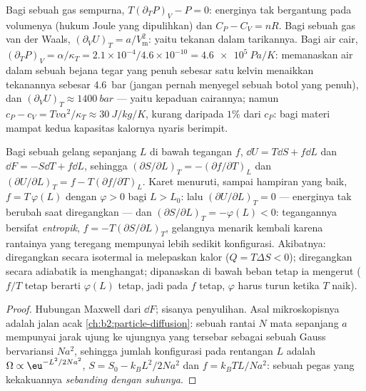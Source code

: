\begin{example}\label{ex:b2:thermodynamic-potentials:reveal}
Bagi sebuah gas sempurna, $T(\partial_TP)_V - P = 0$: energinya tak bergantung
pada volumenya (hukum Joule yang dipulihkan) dan $C_P - C_V = nR$. Bagi sebuah gas van
der Waals, $(\partial_VU)_T = a/V_{\text{m}}^2$: yaitu tekanan dalam
tarikannya. Bagi air cair, $(\partial_TP)_V = \alpha/\kappa_T = 2.1
\times 10^{-4}/4.6 \times 10^{-10} = \qty{4.6e5}{Pa/K}$: memanaskan air dalam sebuah
bejana tegar yang penuh sebesar satu kelvin menaikkan tekanannya sebesar \qty{4.6}{bar}
(jangan pernah menyegel sebuah botol yang penuh), dan $(\partial_VU)_T \approx \qty{1400}{bar}$ ---
yaitu kepaduan cairannya; namun $c_P - c_V = Tv\alpha^2/\kappa_T \approx
\qty{30}{J/kg/K}$, kurang daripada $1\%$ dari $c_P$: bagi materi mampat kedua
kapasitas kalornya nyaris berimpit.
\end{example}

\begin{proposition}\label{prop:b2:thermodynamic-potentials:rubber}
Bagi sebuah gelang sepanjang $L$ di bawah tegangan $f$, $\dd U = T\dd S + f\dd L$
dan $\dd F = -S\dd T + f\dd L$, sehingga $(\partial S/\partial L)_T =
-(\partial f/\partial T)_L$ dan $(\partial U/\partial L)_T = f - T(\partial f/
\partial T)_L$. Karet menuruti, sampai hampiran yang baik, $f = T\,\varphi(L)$
dengan $\varphi > 0$ bagi $L > L_0$: lalu $(\partial U/\partial L)_T = 0$ ---
energinya tak berubah saat diregangkan --- dan $(\partial S/\partial L)_T =
-\varphi(L) < 0$: tegangannya bersifat \emph{entropik}, $f = -T(\partial S/\partial
L)_T$, gelangnya menarik kembali karena rantainya yang teregang mempunyai lebih sedikit
konfigurasi. Akibatnya: diregangkan secara isotermal ia melepaskan kalor
($Q = T\Delta S < 0$); diregangkan secara adiabatik ia menghangat; dipanaskan di bawah
beban tetap ia mengerut ($f/T$ tetap berarti $\varphi(L)$ tetap, jadi pada
$f$ tetap, $\varphi$ harus turun ketika $T$ naik).
\end{proposition}

\begin{proof}
Hubungan Maxwell dari $\dd F$; sisanya penyulihan. Asal
mikroskopisnya adalah jalan acak \cref{ch:b2:particle-diffusion}:
sebuah rantai $N$ mata sepanjang $a$ mempunyai jarak ujung ke ujungnya yang
tersebar sebagai sebuah Gauss bervariansi $Na^2$, sehingga jumlah
konfigurasi pada rentangan $L$ adalah $\Omega \propto \eu^{-L^2/2Na^2}$, $S = S_0 -
k_BL^2/2Na^2$ dan $f = k_BTL/Na^2$: sebuah pegas yang kekakuannya
\emph{sebanding dengan suhunya}.
\end{proof}

